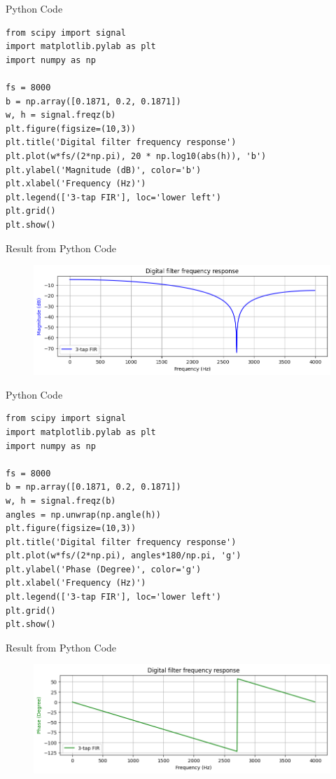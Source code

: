 \documentclass[pdflatex,compress,mathserif]{beamer}
\begin{document}
\begin{frame}[fragile]{Python Code}
    \begin{verbatim}
from scipy import signal
import matplotlib.pylab as plt
import numpy as np

fs = 8000
b = np.array([0.1871, 0.2, 0.1871])
w, h = signal.freqz(b)
plt.figure(figsize=(10,3))
plt.title('Digital filter frequency response')
plt.plot(w*fs/(2*np.pi), 20 * np.log10(abs(h)), 'b')
plt.ylabel('Magnitude (dB)', color='b')
plt.xlabel('Frequency (Hz)')
plt.legend(['3-tap FIR'], loc='lower left')
plt.grid()
plt.show()
    \end{verbatim}
\end{frame}

\begin{frame}{Result from Python Code}
    \begin{figure}
        \centering
        \includegraphics[width=\linewidth]{./img/img11a.png}
    \end{figure}
\end{frame}

\begin{frame}[fragile]{Python Code}
    \begin{verbatim}
from scipy import signal
import matplotlib.pylab as plt
import numpy as np

fs = 8000
b = np.array([0.1871, 0.2, 0.1871])
w, h = signal.freqz(b)
angles = np.unwrap(np.angle(h))
plt.figure(figsize=(10,3))
plt.title('Digital filter frequency response')
plt.plot(w*fs/(2*np.pi), angles*180/np.pi, 'g')
plt.ylabel('Phase (Degree)', color='g')
plt.xlabel('Frequency (Hz)')
plt.legend(['3-tap FIR'], loc='lower left')
plt.grid()
plt.show()
    \end{verbatim}
\end{frame}

\begin{frame}{Result from Python Code}
    \begin{figure}
        \centering
        \includegraphics[width=\linewidth]{./img/img11b.png}
    \end{figure}
\end{frame}
\end{document}
